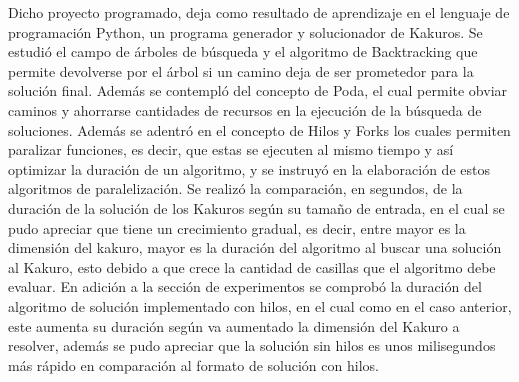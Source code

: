\documentclass[journal]{IEEEtran}
\begin{document}
Dicho proyecto programado, deja como resultado de aprendizaje en el lenguaje de programación Python, un programa generador y solucionador de Kakuros. Se estudió el campo de árboles de búsqueda y el algoritmo de Backtracking que permite devolverse por el árbol si un camino deja de ser prometedor para la solución final. Además se contempló del concepto de Poda, el cual permite obviar caminos y ahorrarse cantidades de recursos en la ejecución de la búsqueda de soluciones. Además se adentró en el concepto de Hilos y Forks los cuales permiten paralizar funciones, es decir, que estas se ejecuten al mismo tiempo y así optimizar la duración de un algoritmo, y se instruyó en la elaboración de estos algoritmos de paralelización. Se realizó la comparación, en segundos, de la duración de la solución de los Kakuros según su tamaño de entrada, en el cual se pudo apreciar que tiene un crecimiento gradual, es decir, entre mayor es la dimensión del kakuro, mayor es la duración del algoritmo al buscar una solución al Kakuro, esto debido a que crece la cantidad de casillas que el algoritmo debe evaluar. En adición a la sección de experimentos se comprobó la duración del algoritmo de solución implementado con hilos, en el cual como en el caso anterior, este aumenta su duración según va aumentado la dimensión del Kakuro a resolver, además se pudo apreciar que la solución sin hilos es unos milisegundos más rápido en comparación al formato de solución con hilos.
\end{document}
